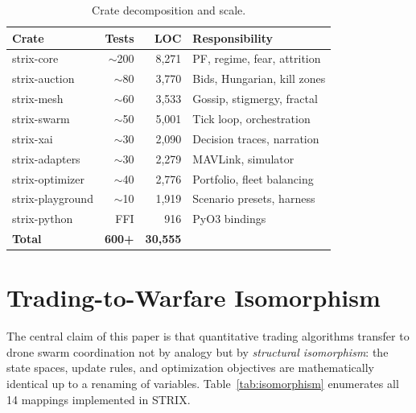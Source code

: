 \documentclass[conference]{IEEEtran}
\begin{document}
\begin{table}[t]
\centering
\caption{Crate decomposition and scale.}
\label{tab:crates}
\begin{tabular}{@{}lrrl@{}}
\toprule
\textbf{Crate} & \textbf{Tests} & \textbf{LOC} & \textbf{Responsibility} \\
\midrule
strix-core      & $\sim$200 & 8,271 & PF, regime, fear, attrition \\
strix-auction   & $\sim$80  & 3,770 & Bids, Hungarian, kill zones \\
strix-mesh      & $\sim$60  & 3,533 & Gossip, stigmergy, fractal \\
strix-swarm     & $\sim$50  & 5,001 & Tick loop, orchestration \\
strix-xai       & $\sim$30  & 2,090 & Decision traces, narration \\
strix-adapters  & $\sim$30  & 2,279 & MAVLink, simulator \\
strix-optimizer & $\sim$40  & 2,776 & Portfolio, fleet balancing \\
strix-playground& $\sim$10  & 1,919 & Scenario presets, harness \\
strix-python    & FFI       &   916 & PyO3 bindings \\
\midrule
\textbf{Total}  & \textbf{600{+}} & \textbf{30,555} & \\
\bottomrule
\end{tabular}
\end{table}


\section{Trading-to-Warfare Isomorphism}
\label{sec:isomorphism}

The central claim of this paper is that quantitative trading
algorithms transfer to drone swarm coordination not by analogy but by
\emph{structural isomorphism}: the state spaces, update rules, and
optimization objectives are mathematically identical up to a renaming
of variables.  Table~\ref{tab:isomorphism} enumerates all 14 mappings
implemented in STRIX.
\end{document}
